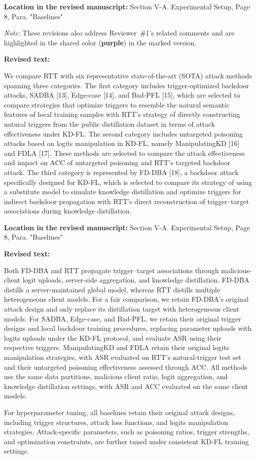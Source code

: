 \documentclass[11pt,a4paper]{article}
\newcommand{\manualindent}{\par\noindent\hspace*{1.5em}\ignorespaces}
\newcommand{\revisedtext}[2]{%
  {\bfseries\color{headingnavy}Location in the revised manuscript:} #1\par
  \begin{tcolorbox}[
      enhanced,breakable,colback=replyblue!3,colframe=replyblue!18,
      before upper={\setlength{\parskip}{6pt}},
      borderline west={2.5pt}{0pt}{replyblue},
      boxrule=0.5pt,arc=1mm,left=11pt,right=9pt,top=8pt,bottom=8pt]
    {\bfseries\color{headingnavy}Revised text:}\par
    #2
  \end{tcolorbox}
  \vspace{0.35em}%
}
\begin{document}
\revisedtext{Section V-A. Experimental Setup, Page 8, Para. "Baselines"\par \noindent \textit{Note:} These revisions also address Reviewer~\#1's related comments and are highlighted in the shared color (\textcolor{share}{\textbf{purple}}) in the marked version.}{\manualindent We compare RTT with six representative state-of-the-art (SOTA) attack methods spanning three categories.
The first category includes trigger-optimized backdoor attacks, SADBA [13], Edge-case [14], and Bad-PFL [15], which are selected to compare strategies that optimize triggers to resemble the natural semantic features of local training samples with RTT's strategy of directly constructing natural triggers from the public distillation dataset in terms of attack effectiveness under KD-FL.
The second category includes untargeted poisoning attacks based on logits manipulation in KD-FL, namely ManipulatingKD [16] and FDLA [17].
These methods are selected to compare the attack effectiveness and impact on ACC of untargeted poisoning and RTT's targeted backdoor attack.
The third category is represented by FD-DBA [18], a backdoor attack specifically designed for KD-FL, which is selected to compare its strategy of using a substitute model to simulate knowledge distillation and optimize triggers for indirect backdoor propagation with RTT's direct reconstruction of trigger--target associations during knowledge distillation.
}

\revisedtext{Section V-A. Experimental Setup, Page 8, Para. "Baselines"}{
\manualindent Both FD-DBA and RTT propagate trigger--target associations through malicious-client logit uploads, server-side aggregation, and knowledge distillation.
FD-DBA distills a server-maintained global model, whereas RTT distills multiple heterogeneous client models.
For a fair comparison, we retain FD-DBA's original attack design and only replace its distillation target with heterogeneous client models.
For SADBA, Edge-case, and Bad-PFL, we retain their original trigger designs and local backdoor training procedures, replacing parameter uploads with logits uploads under the KD-FL protocol, and evaluate ASR using their respective triggers.
ManipulatingKD and FDLA retain their original logits manipulation strategies, with ASR evaluated on RTT's natural-trigger test set and their untargeted poisoning effectiveness assessed through ACC.
All methods use the same data partitions, malicious client ratio, logit aggregation, and knowledge distillation settings, with ASR and ACC evaluated on the same client models.

\manualindent For hyperparameter tuning, all baselines retain their original attack designs, including trigger structures, attack loss functions, and logits manipulation strategies. Attack-specific parameters, such as poisoning ratios, trigger strengths, and optimization constraints, are further tuned under consistent KD-FL training settings.
}
\end{document}
